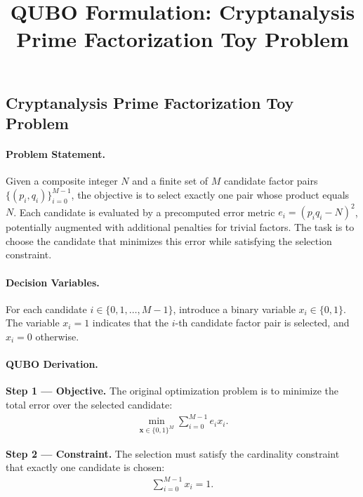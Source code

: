 \documentclass[12pt]{article}
\title{QUBO Formulation: Cryptanalysis Prime Factorization Toy Problem}
\date{}
\begin{document}
\maketitle

\subsection*{Cryptanalysis Prime Factorization Toy Problem}

\paragraph{Problem Statement.}
Given a composite integer $N$ and a finite set of $M$ candidate factor pairs $\{(p_i, q_i)\}_{i=0}^{M-1}$, the objective is to select exactly one pair whose product equals $N$. Each candidate is evaluated by a precomputed error metric $e_i = (p_i q_i - N)^2$, potentially augmented with additional penalties for trivial factors. The task is to choose the candidate that minimizes this error while satisfying the selection constraint.

\paragraph{Decision Variables.}
For each candidate $i \in \{0, 1, \dots, M-1\}$, introduce a binary variable $x_i \in \{0,1\}$. The variable $x_i = 1$ indicates that the $i$-th candidate factor pair is selected, and $x_i = 0$ otherwise.

\paragraph{QUBO Derivation.}
\textbf{Step 1 --- Objective.} The original optimization problem is to minimize the total error over the selected candidate:
\begin{align}
\min_{\mathbf{x} \in \{0,1\}^M} \sum_{i=0}^{M-1} e_i x_i.
\end{align}

\textbf{Step 2 --- Constraint.} The selection must satisfy the cardinality constraint that exactly one candidate is chosen:
\begin{align}
\sum_{i=0}^{M-1} x_i = 1.
\end{align}
\end{document}
